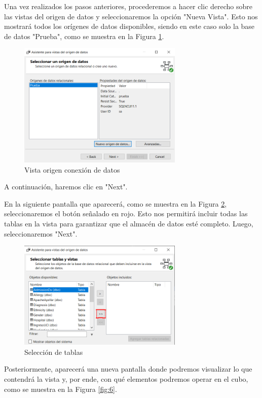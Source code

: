 \documentclass[12pt, a4paper, twoside]{article}
\begin{document}
Una vez realizados los pasos anteriores, procederemos a hacer clic derecho sobre las vistas del origen de datos y seleccionaremos la opción "Nueva Vista". Esto nos mostrará todos los orígenes de datos disponibles, siendo en este caso solo la base de datos "Prueba", como se muestra en la Figura \ref{fig:4}.

\begin{figure}[H]
	\centering
	\includegraphics[width=0.7\textwidth]{image/vistaOrigenConexion}
	\caption{Vista origen conexión de datos}
	\label{fig:4}
\end{figure}

A continuación, haremos clic en "Next".

En la siguiente pantalla que aparecerá, como se muestra en la Figura \ref{fig:5}, seleccionaremos el botón señalado en rojo. Esto nos permitirá incluir todas las tablas en la vista para garantizar que el almacén de datos esté completo. Luego, seleccionaremos "Next".

\begin{figure}[H]
	\centering
	\includegraphics[width=0.7\textwidth]{image/seleccionTablas}
	\caption{Selección de tablas}
	\label{fig:5}
\end{figure}

Posteriormente, aparecerá una nueva pantalla donde podremos visualizar lo que contendrá la vista y, por ende, con qué elementos podremos operar en el cubo, como se muestra en la Figura \ref{fig:6}.
\end{document}
